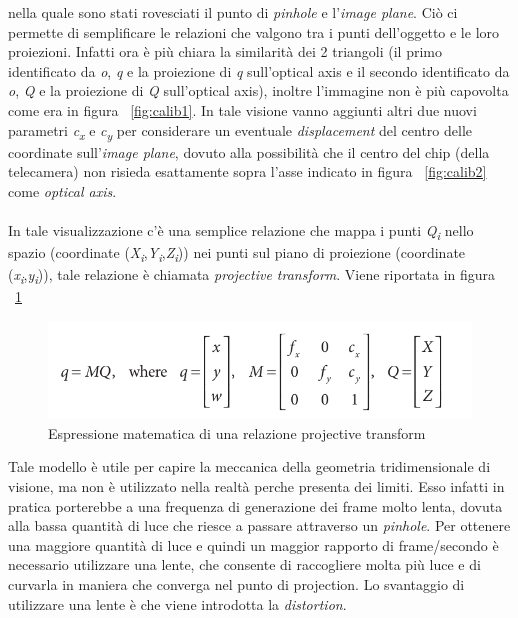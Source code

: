 nella quale sono stati rovesciati il punto di \textit{pinhole} e l'\textit{image plane}. Ciò ci permette di semplificare le relazioni che valgono tra i punti dell'oggetto e le loro proiezioni. Infatti ora è più chiara la similarità dei 2 triangoli (il primo identificato da \textit{o}, \textit{q} e la proiezione di \textit{q} sull'optical axis e il secondo identificato da \textit{o}, \textit{Q} e la proiezione di \textit{Q} sull'optical axis), inoltre l'immagine non è più capovolta come era in figura ~\ref{fig:calib1}. In tale visione vanno aggiunti altri due nuovi parametri \textit{c\textsubscript{x} }e \textit{c\textsubscript{y}} per considerare un eventuale \textit{displacement} del centro delle coordinate sull'\textit{image plane}, dovuto alla possibilità che il centro del chip (della telecamera) non risieda esattamente sopra l'asse indicato in figura ~\ref{fig:calib2} come \textit{optical axis}. \\ \\
In tale visualizzazione c'è una semplice relazione che mappa i punti \textit{Q\textsubscript{i}} nello spazio (coordinate (\textit{X\textsubscript{i}},\textit{Y\textsubscript{i}},\textit{Z\textsubscript{i}})) nei punti sul piano di proiezione (coordinate (\textit{x\textsubscript{i}},\textit{y\textsubscript{i}})), tale relazione è chiamata \textit{projective transform}. Viene riportata in figura ~\ref{fig:calib3}
\begin{figure}[htpb] 
\centering 
\includegraphics[scale=0.4]{./images/calib3.png} 
\caption{Espressione matematica di una relazione projective transform} 
\label{fig:calib3}
\end{figure} 

Tale modello è utile per capire la meccanica della geometria tridimensionale di visione, ma non è utilizzato nella realtà perche presenta dei limiti. Esso infatti in pratica porterebbe a una frequenza di generazione dei frame molto lenta, dovuta alla bassa quantità di luce che riesce a passare attraverso un \textit{pinhole}. Per ottenere una maggiore quantità di luce e quindi un maggior rapporto di frame/secondo è necessario utilizzare una lente, che consente di raccogliere molta più luce e di curvarla in maniera che converga nel punto di projection. Lo svantaggio di utilizzare una lente è che viene introdotta la \textit{distortion}. \\ \\

